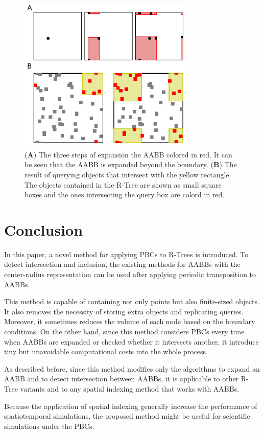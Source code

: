 \documentclass[10pt,letterpaper,twocolumn]{article}
\begin{document}
\begin{figure}[tb]
    \includegraphics[width=8.4cm, bb=4 6 237 212]{fig-result-expand-intersect.eps}
    \caption{
    (\textbf{A})
    The three steps of expansion the AABB colored in red.
    It can be seen that the AABB is expanded beyond the boundary.
    (\textbf{B})
    The result of querying objects that intersect with the yellow rectangle.
    The objects contained in the R-Tree are shown as small square boxes
    and the ones intersecting the query box are colord in red.
    }
    \label{fig-result}
\end{figure}

\section*{Conclusion}

In this paper, a novel method for applying PBCs to R-Trees is introduced.
To detect intersection and inclusion, the existing methods for AABBs with
the center-radius representation can be used after applying periodic
transposition to AABBs.

This method is capable of containing not only points but also finite-sized
objects. It also removes the necessity of storing extra objects and
replicating queries. Moreover, it sometimes reduces the volume of each node
based on the boundary conditions.
On the other hand, since this method considers PBCs every time when AABBs are
expanded or checked whether it intersects another, it introduce tiny but
unavoidable computational costs into the whole process.

As described before, since this method modifies only the algorithms to expand an
AABB and to detect intersection between AABBs, it is applicable to other R-Tree
variants and to any spatial indexing method that works with AABBs.

Because the application of spatial indexing generally increase the performance
of spatiotemporal simulations, the proposed method might be useful for
scientific simulations under the PBCs.


{}
\end{document}
